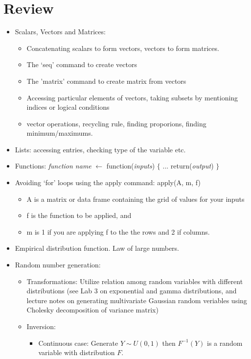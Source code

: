 \documentclass[12pt]{article}
\numberwithin{equation}{subsection}
\begin{document}
\section{Review}

\begin{itemize}
	\item Scalars, Vectors and Matrices:
	\begin{itemize}
	\item Concatenating scalars to form vectors, vectors to form matrices. 
	\item The `seq' command to create vectors
	\item The 'matrix' command to create matrix from vectors
	\item Accessing particular elements of vectors, taking subsets by mentioning indices or logical conditions
	\item vector operations, recycling rule, finding proporions, finding minimum/maximums.
\end{itemize}
\item Lists: accessing entries, checking type of the variable etc.
	\item Functions:  {\it function name} $\leftarrow$ function({\it inputs}) $\{$ ... return({\it output}) $\}$
	\item Avoiding `for' loops using the apply command: apply(A, m, f)
	\begin{itemize}
	\item A is a matrix or data frame containing the grid of values for your inputs
	\item f is the function to be applied, and 
	\item m is 1 if you are applying f to the the rows and 2 if columns.
\end{itemize}
	\item Empirical distribution function. Law of large numbers. 
	\item Random number generation:
	\begin{itemize}
		\item Transformations: Utilize relation among random variables with different distributions (see Lab 3 on exponential and gamma distributions, and lecture notes on generating multivariate Gaussian random veriables using Cholesky decomposition of variance matrix)
		\item Inversion:
		\begin{itemize}
			\item Continuous case: Generate $Y \sim U(0,1)$ then $F^{-1} (Y)$  is a random variable with distribution $F$.

\end{itemize}
\end{itemize}
\end{itemize}
\end{document}
